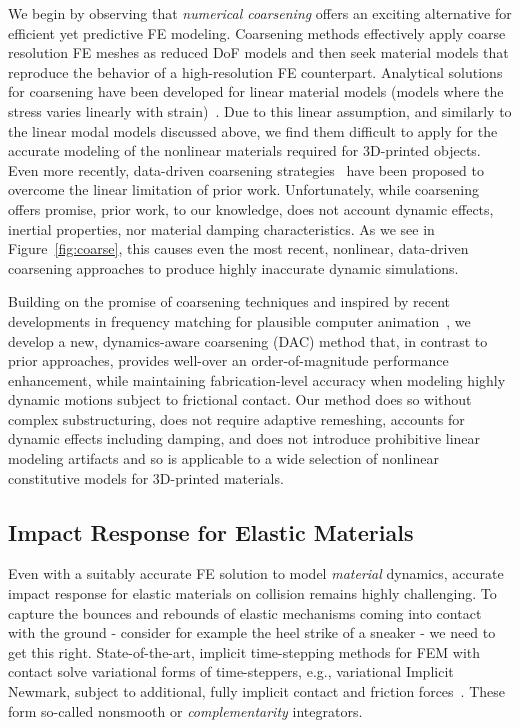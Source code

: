 We begin by observing that \emph{numerical coarsening} offers an exciting alternative for efficient yet predictive FE modeling. Coarsening methods effectively apply coarse resolution FE meshes as reduced DoF models and then seek material models that reproduce the behavior of a high-resolution FE counterpart. Analytical solutions for coarsening have been developed for linear material models (models where the stress varies linearly with strain)~\cite{Kharevych:2009cg,Nesme:2009:PTE,Torres:2016:HIC}.
Due to this linear assumption, and similarly to the linear modal models discussed above, we find them difficult to apply for the accurate modeling of the nonlinear materials required for 3D-printed objects.
Even more recently, data-driven coarsening strategies~\cite{chen2015:ddfem} have been proposed to overcome the linear limitation of prior work. Unfortunately, while coarsening offers promise, prior work, to our knowledge, does not account dynamic effects, inertial properties, nor material damping characteristics.
As we see in Figure~\ref{fig:coarse}, this causes even the most recent, nonlinear, data-driven coarsening approaches to produce highly inaccurate dynamic simulations.

Building on the promise of coarsening techniques and inspired by recent developments in frequency matching for plausible computer animation~\cite{Li:2014:SEE,BinWang:2015fx}, we develop a new, dynamics-aware coarsening (DAC) method that, in contrast to prior approaches, provides well-over an order-of-magnitude performance enhancement, while maintaining fabrication-level accuracy when modeling highly dynamic motions subject to frictional contact. Our method does so without complex substructuring, does not require adaptive remeshing, accounts for dynamic effects including damping, and does not introduce prohibitive linear modeling artifacts and so is applicable to a wide selection of nonlinear constitutive models for 3D-printed materials.  

\subsection{Impact Response for Elastic Materials}
Even with a suitably accurate FE solution to model \emph{material} dynamics, accurate impact response for elastic materials on collision remains highly challenging.  To capture the bounces and rebounds of elastic mechanisms coming into contact with the ground - consider for example the heel strike of a sneaker - we need to get this right. State-of-the-art, implicit time-stepping methods for FEM with contact solve variational forms of time-steppers, e.g., variational Implicit Newmark, subject to additional, fully implicit contact and friction forces~\cite{Kane:1999kr,Pandolfi:2002ik}. 
These form so-called nonsmooth or \emph{complementarity} integrators. 


